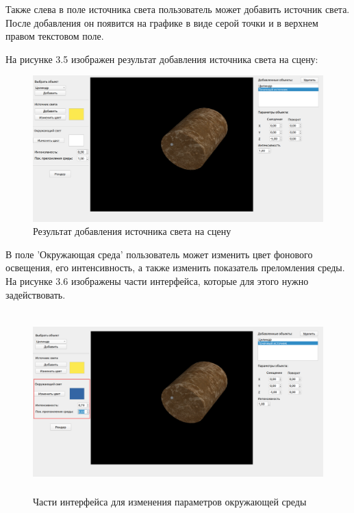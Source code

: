 Также слева в поле источника света пользователь может добавить источник света.
После добавления он появится на графике в виде серой точки и в верхнем правом текстовом поле.

На рисунке 3.5 изображен результат добавления источника света на сцену:
\FloatBarrier
\begin{figure}[h]
	\begin{center}
		\includegraphics[width=\linewidth]{inc/light.png}
	\end{center}
	\caption{Результат добавления источника света на сцену}
\end{figure}
\FloatBarrier

В поле 'Окружающая среда' пользователь может изменить цвет фонового освещения, его интенсивность, а также изменить показатель преломления среды.
На рисунке 3.6 изображены части интерфейса, которые для этого нужно задействовать.
\FloatBarrier
\begin{figure}[h]
	\begin{center}
		\includegraphics[height = 7cm, width=15cm]{inc/amb.png}
	\end{center}
	\caption{Части интерфейса для изменения параметров окружающей среды}
\end{figure}
\FloatBarrier

